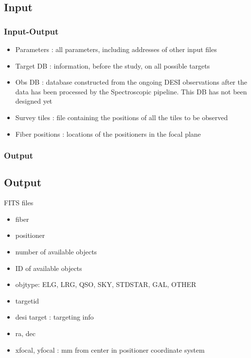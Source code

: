 \documentclass{beamer}
\begin{document}
\begin{frame}
	\subsection{Input}\frametitle{Input-Output}
	\begin{itemize} 
		\item Parameters : all parameters, including addresses of other input files
		\item Target DB : information, before the study, on all possible targets
		\item Obs DB : database constructed from the ongoing DESI observations after the data has been processed by the Spectroscopic pipeline. This DB has not been designed yet
		\item Survey tiles : file containing the positions of all the tiles to be observed
		\item Fiber positions : locations of the positioners in the focal plane
	\end{itemize} 
\end{frame}

\begin{frame}\frametitle{Output}
	\subsection{Output}
	FITS files
	\begin{itemize} 
		\item fiber
		\item positioner
		\item number of available objects
		\item ID of available objects
		\item objtype: ELG, LRG, QSO, SKY, STDSTAR, GAL, OTHER
		\item targetid
		\item desi target : targeting info
		\item ra, dec
		\item xfocal, yfocal : mm from center in positioner coordinate system
	\end{itemize} 
\end{frame}
\end{document}
